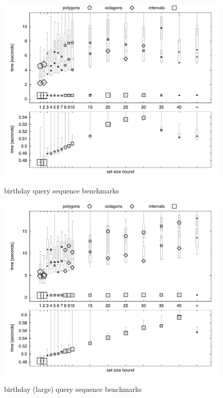 \begin{figure}[t!]
\scriptsize
\centering
\includegraphics[width=12.5cm]{figures/plot_domains_bday.pdf} \\
\caption{birthday query sequence benchmarks}
\label{fig:bench_domains_bday}
\end{figure}

\begin{figure}[t!]
\scriptsize
\centering
\includegraphics[width=12.5cm]{figures/plot_domains_bday_large.pdf} \\
\caption{birthday (large) query sequence benchmarks}
\label{fig:bench_domains_bday_large}
\end{figure}

